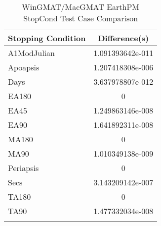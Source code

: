 \begin{table}[htbp!]
\centering
\caption{ WinGMAT/MacGMAT EarthPM StopCond Test Case Comparison}
      \begin{tabular}{lc}
      \hline\hline
          Stopping Condition & Difference(s) \\
         \hline
         A1ModJulian & 1.091393642e-011 \\
         Apoapsis & 1.207418308e-006 \\
         Days & 3.637978807e-012 \\
         EA180 & 0 \\
         EA45 & 1.249863146e-008 \\
         EA90 & 1.641892311e-008 \\
         MA180 & 0 \\
         MA90 & 1.010349138e-009 \\
         Periapsis & 0 \\
         Secs & 3.143209142e-007 \\
         TA180 & 0 \\
         TA90 & 1.477332034e-008 \\
      \hline\hline
      \label{Table: WinGMAT-MacGMAT EarthPM StopCond Table} 
\end{tabular}
\end{table}
